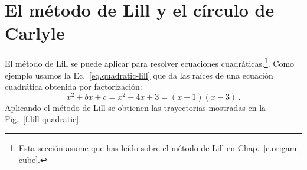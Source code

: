 
\section{El método de Lill y el círculo de Carlyle}\label{s.lill-quadratic}

El método de Lill se puede aplicar para resolver ecuaciones cuadráticas.\footnote{Esta sección asume que has leído sobre el método de Lill en Chap.~\ref{c.origami-cube}.}. Como ejemplo usamos la Ec.~\ref{eq.quadratic-lill} que da las raíces de una ecuación cuadrática obtenida por factorización:
\[
x^2+bx+c=x^2-4x+3= (x-1)(x-3)\,.
\]
Aplicando el método de Lill se obtienen las trayectorias mostradas en la Fig.~\ref{f.lill-quadratic}.

